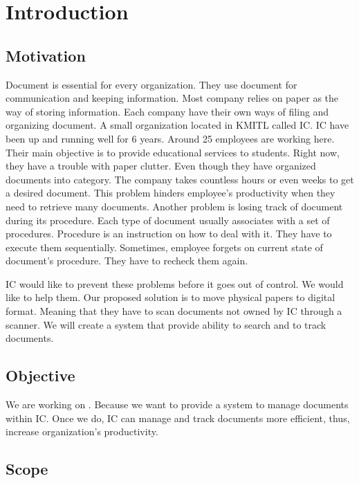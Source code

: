 \chapter{Introduction}

\section{Motivation}
Document is essential for every organization. 
They use document for communication and keeping information.
Most company relies on paper as the way of storing information.
Each company have their own ways of filing and organizing document. 
A small organization located in KMITL called IC. 
IC have been up and running well for 6 years. Around 25 employees are working here. 
Their main objective is to provide educational services to students. 
Right now, they have a trouble with paper clutter. 
Even though they have organized documents into category. 
The company takes countless hours or even weeks to get a desired document. 
This problem hinders employee's productivity when they need to retrieve many documents. 
Another problem is losing track of document during its procedure. 
Each type of document usually associates with a set of procedures. 
Procedure is an instruction on how to deal with it. 
They have to execute them sequentially. 
Sometimes, employee forgets on current state of document's procedure. 
They have to recheck them again.

IC would like to prevent these problems before it goes out of control. 
We would like to help them. 
Our proposed solution is to move physical papers to digital format. 
Meaning that they have to scan documents not owned by IC through a scanner. 
We will create a system that provide ability to search and to track documents.

\section{Objective}
We are working on \dms.
Because we want to provide a system to manage documents within IC.
Once we do, IC can manage and track documents more efficient, thus, increase organization's productivity.

\section{Scope}
